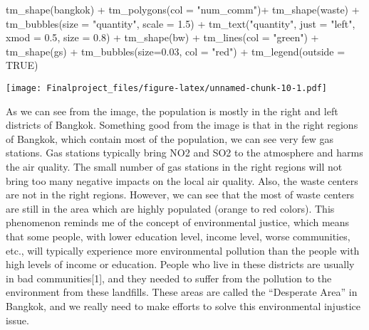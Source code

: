 \documentclass[
]{article}
\newenvironment{Shaded}{\begin{snugshade}}{\end{snugshade}}
\newcommand{\AttributeTok}[1]{\textcolor[rgb]{0.77,0.63,0.00}{#1}}
\newcommand{\ConstantTok}[1]{\textcolor[rgb]{0.00,0.00,0.00}{#1}}
\newcommand{\FloatTok}[1]{\textcolor[rgb]{0.00,0.00,0.81}{#1}}
\newcommand{\FunctionTok}[1]{\textcolor[rgb]{0.00,0.00,0.00}{#1}}
\newcommand{\NormalTok}[1]{#1}
\newcommand{\SpecialCharTok}[1]{\textcolor[rgb]{0.00,0.00,0.00}{#1}}
\newcommand{\StringTok}[1]{\textcolor[rgb]{0.31,0.60,0.02}{#1}}
\begin{document}
\begin{Shaded}
\begin{Highlighting}[]
\FunctionTok{tm\_shape}\NormalTok{(bangkok) }\SpecialCharTok{+} \FunctionTok{tm\_polygons}\NormalTok{(}\AttributeTok{col =} \StringTok{"num\_comm"}\NormalTok{)}\SpecialCharTok{+}
  \FunctionTok{tm\_shape}\NormalTok{(waste) }\SpecialCharTok{+} \FunctionTok{tm\_bubbles}\NormalTok{(}\AttributeTok{size =} \StringTok{"quantity"}\NormalTok{, }\AttributeTok{scale =} \FloatTok{1.5}\NormalTok{) }\SpecialCharTok{+} \FunctionTok{tm\_text}\NormalTok{(}\StringTok{"quantity"}\NormalTok{, }\AttributeTok{just =} \StringTok{"left"}\NormalTok{, }\AttributeTok{xmod =} \FloatTok{0.5}\NormalTok{, }\AttributeTok{size =} \FloatTok{0.8}\NormalTok{) }\SpecialCharTok{+}
  \FunctionTok{tm\_shape}\NormalTok{(bw) }\SpecialCharTok{+} \FunctionTok{tm\_lines}\NormalTok{(}\AttributeTok{col =} \StringTok{"green"}\NormalTok{) }\SpecialCharTok{+} 
  \FunctionTok{tm\_shape}\NormalTok{(gs) }\SpecialCharTok{+} \FunctionTok{tm\_bubbles}\NormalTok{(}\AttributeTok{size=}\FloatTok{0.03}\NormalTok{, }\AttributeTok{col =} \StringTok{"red"}\NormalTok{) }\SpecialCharTok{+}
  \FunctionTok{tm\_legend}\NormalTok{(}\AttributeTok{outside =} \ConstantTok{TRUE}\NormalTok{)}
\end{Highlighting}
\end{Shaded}

\texttt{[image: Finalproject\_files/figure-latex/unnamed-chunk-10-1.pdf]}

As we can see from the image, the population is mostly in the right and
left districts of Bangkok. Something good from the image is that in the
right regions of Bangkok, which contain most of the population, we can
see very few gas stations. Gas stations typically bring NO2 and SO2 to
the atmosphere and harms the air quality. The small number of gas
stations in the right regions will not bring too many negative impacts
on the local air quality. Also, the waste centers are not in the right
regions. However, we can see that the most of waste centers are still in
the area which are highly populated (orange to red colors). This
phenomenon reminds me of the concept of environmental justice, which
means that some people, with lower education level, income level, worse
communities, etc., will typically experience more environmental
pollution than the people with high levels of income or education.
People who live in these districts are usually in bad
communities{[}1{]}, and they needed to suffer from the pollution to the
environment from these landfills. These areas are called the ``Desperate
Area'' in Bangkok, and we really need to make efforts to solve this
environmental injustice issue.
\end{document}
